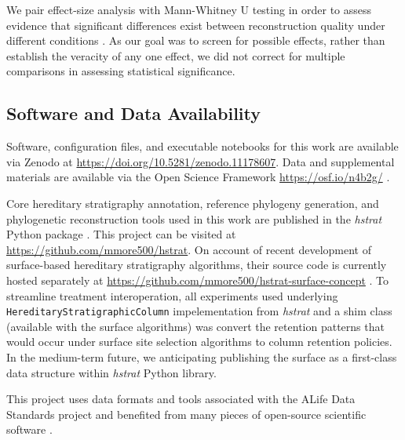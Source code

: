 We pair effect-size analysis with Mann-Whitney U testing in order to assess evidence that significant differences exist between reconstruction quality under different conditions \citep{mann1947on}.
As our goal was to screen for possible effects, rather than establish the veracity of any one effect, we did not correct for multiple comparisons in assessing statistical significance.

\subsection{Software and Data Availability}

Software, configuration files, and executable notebooks for this work are available via Zenodo at \url{https://doi.org/10.5281/zenodo.11178607}.
Data and supplemental materials are available via the Open Science Framework \url{https://osf.io/n4b2g/} \citep{foster2017open}.

Core hereditary stratigraphy annotation, reference phylogeny generation, and phylogenetic reconstruction tools used in this work are published in the \textit{hstrat} Python package \citep{moreno2022hstrat}.
This project can be visited at \url{https://github.com/mmore500/hstrat}.
On account of recent development of surface-based hereditary stratigraphy algorithms, their source code is currently hosted separately at \url{https://github.com/mmore500/hstrat-surface-concept} \citep{moreno2024hsurf}.
To streamline treatment interoperation, all experiments used underlying \texttt{HereditaryStratigraphicColumn} impelementation from \textit{hstrat} and a shim class (available with the surface algorithms) was convert the retention patterns that would occur under surface site selection algorithms to column retention policies.
In the medium-term future, we anticipating publishing the surface as a first-class data structure within \textit{hstrat} Python library.

This project uses data formats and tools associated with the ALife Data Standards project \citep{lalejini2019data} and benefited from many pieces of open-source scientific software \citep{ofria2020empirical,sand2014tqdist,2020SciPy-NMeth,harris2020array,reback2020pandas,mckinney-proc-scipy-2010,sukumaran2010dendropy,cock2009biopython,torchiano2016effsize,waskom2021seaborn,hunter2007matplotlib,moreno2024apc,moreno2024qspool,moreno2023teeplot,hagen2021gen3sis,torchiano2016effsize}.
